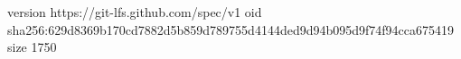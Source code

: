 version https://git-lfs.github.com/spec/v1
oid sha256:629d8369b170cd7882d5b859d789755d4144ded9d94b095d9f74f94cca675419
size 1750

